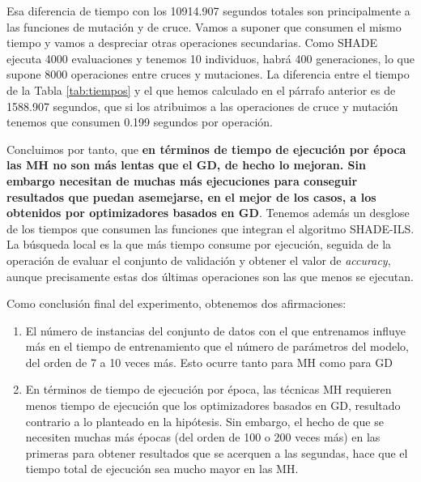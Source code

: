 Esa diferencia de tiempo con los 10914.907 segundos totales son principalmente a las funciones de mutación y de cruce. Vamos a suponer que consumen el mismo tiempo y vamos a despreciar otras operaciones secundarias. Como SHADE ejecuta 4000 evaluaciones y tenemos 10 individuos, habrá 400 generaciones, lo que supone 8000 operaciones entre cruces y mutaciones. La diferencia entre el tiempo de la Tabla \ref{tab:tiempos} y el que hemos calculado en el párrafo anterior es de 1588.907 segundos, que si los atribuimos a las operaciones de cruce y mutación tenemos que consumen 0.199 segundos por operación. 

Concluimos por tanto, que \textbf{en términos de tiempo de ejecución por época las MH no son más lentas que el GD, de hecho lo mejoran. Sin embargo necesitan de muchas más ejecuciones para conseguir resultados que puedan asemejarse, en el mejor de los casos, a los obtenidos por optimizadores basados en GD}. Tenemos además un desglose de los tiempos que consumen las funciones que integran el algoritmo SHADE-ILS. La búsqueda local es la que más tiempo consume por ejecución, seguida de la operación de evaluar el conjunto de validación y obtener el valor de \textit{accuracy}, aunque precisamente estas dos últimas operaciones son las que menos se ejecutan. 

Como conclusión final del experimento, obtenemos dos afirmaciones:

\begin{enumerate}

\item El número de instancias del conjunto de datos con el que entrenamos influye más en el tiempo de entrenamiento que el número de parámetros del modelo, del orden de 7 a 10 veces más. Esto ocurre tanto para MH como para GD

\item En términos de tiempo de ejecución por época, las técnicas MH requieren menos tiempo de ejecución que los optimizadores basados en GD, resultado contrario a lo planteado en la hipótesis. Sin embargo, el hecho de que se necesiten muchas más épocas (del orden de 100 o 200 veces más) en las primeras para obtener resultados que se acerquen a las segundas, hace que el tiempo total de ejecución sea mucho mayor en las MH.

\end{enumerate}







